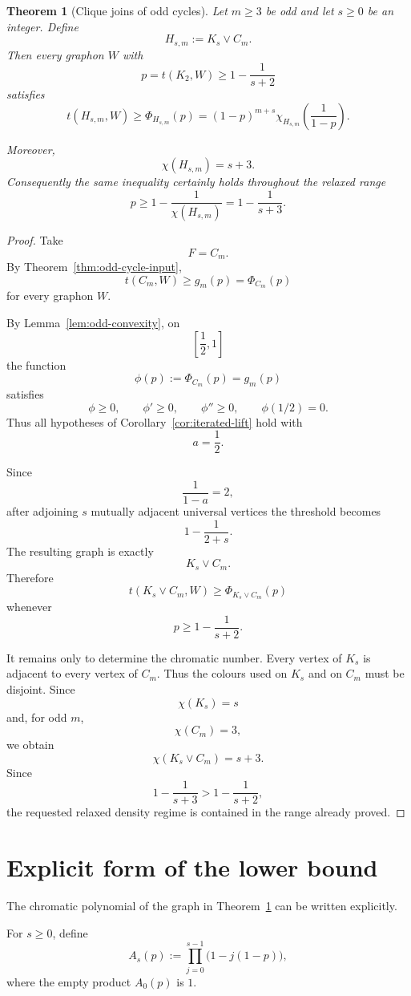 \documentclass[11pt]{article}
\newtheorem{theorem}{Theorem}[section]
\newcommand{\1}{\mathbf{1}}
\newcommand{\join}{\vee}
\begin{document}
\begin{theorem}[Clique joins of odd cycles]
\label{thm:clique-join-cycle}
Let $m\ge3$ be odd and let $s\ge0$ be an integer.  Define
\[
H_{s,m}:=K_s\join C_m.
\]
Then every graphon $W$ with
\[
p=t(K_2,W)
\ge
1-\frac1{s+2}
\]
satisfies
\[
\boxed{
t(H_{s,m},W)
\ge
\Phi_{H_{s,m}}(p)
=
(1-p)^{m+s}
\chi_{H_{s,m}}
\!\left(\frac1{1-p}\right).
}
\]

Moreover,
\[
\chi(H_{s,m})=s+3.
\]
Consequently the same inequality certainly holds throughout the
relaxed range
\[
p\ge
1-\frac1{\chi(H_{s,m})}
=
1-\frac1{s+3}.
\]
\end{theorem}

\begin{proof}
Take
\[
F=C_m.
\]
By Theorem~\ref{thm:odd-cycle-input},
\[
t(C_m,W)\ge g_m(p)=\Phi_{C_m}(p)
\]
for every graphon $W$.

By Lemma~\ref{lem:odd-convexity}, on
\[
\left[\frac12,1\right]
\]
the function
\[
\phi(p):=\Phi_{C_m}(p)=g_m(p)
\]
satisfies
\[
\phi\ge0,
\qquad
\phi'\ge0,
\qquad
\phi''\ge0,
\qquad
\phi(1/2)=0.
\]
Thus all hypotheses of
Corollary~\ref{cor:iterated-lift}
hold with
\[
a=\frac12.
\]

Since
\[
\frac1{1-a}=2,
\]
after adjoining $s$ mutually adjacent universal vertices the threshold
becomes
\[
1-\frac1{2+s}.
\]
The resulting graph is exactly
\[
K_s\join C_m.
\]
Therefore
\[
t(K_s\join C_m,W)
\ge
\Phi_{K_s\join C_m}(p)
\]
whenever
\[
p\ge1-\frac1{s+2}.
\]

It remains only to determine the chromatic number.
Every vertex of $K_s$ is adjacent to every vertex of $C_m$.
Thus the colours used on $K_s$ and on $C_m$ must be disjoint.
Since
\[
\chi(K_s)=s
\]
and, for odd $m$,
\[
\chi(C_m)=3,
\]
we obtain
\[
\chi(K_s\join C_m)=s+3.
\]
Since
\[
1-\frac1{s+3}
>
1-\frac1{s+2},
\]
the requested relaxed density regime is contained in the range already
proved.
\end{proof}


\section{Explicit form of the lower bound}

The chromatic polynomial of the graph in
Theorem~\ref{thm:clique-join-cycle}
can be written explicitly.

For $s\ge0$, define
\[
A_s(p)
:=
\prod_{j=0}^{s-1}
\bigl(1-j(1-p)\bigr),
\]
where the empty product $A_0(p)$ is $1$.
\end{document}
